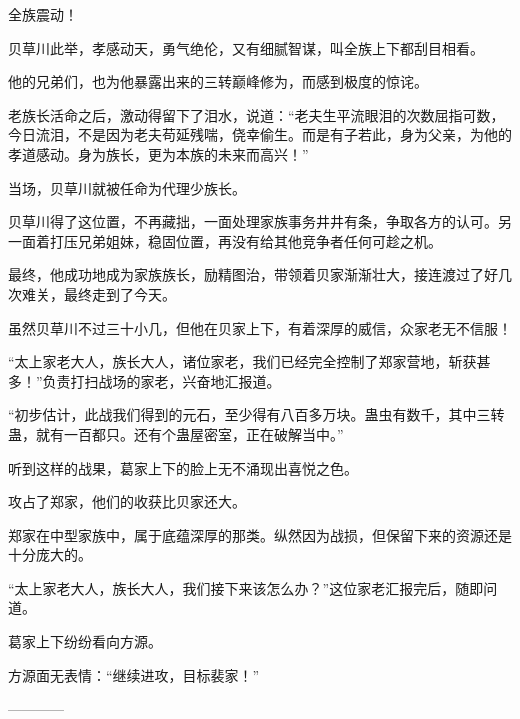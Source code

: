 \begin{this_body}
全族震动！

贝草川此举，孝感动天，勇气绝伦，又有细腻智谋，叫全族上下都刮目相看。

他的兄弟们，也为他暴露出来的三转巅峰修为，而感到极度的惊诧。

老族长活命之后，激动得留下了泪水，说道：“老夫生平流眼泪的次数屈指可数，今日流泪，不是因为老夫苟延残喘，侥幸偷生。而是有子若此，身为父亲，为他的孝道感动。身为族长，更为本族的未来而高兴！”

当场，贝草川就被任命为代理少族长。

贝草川得了这位置，不再藏拙，一面处理家族事务井井有条，争取各方的认可。另一面着打压兄弟姐妹，稳固位置，再没有给其他竞争者任何可趁之机。

最终，他成功地成为家族族长，励精图治，带领着贝家渐渐壮大，接连渡过了好几次难关，最终走到了今天。

虽然贝草川不过三十小几，但他在贝家上下，有着深厚的威信，众家老无不信服！

“太上家老大人，族长大人，诸位家老，我们已经完全控制了郑家营地，斩获甚多！”负责打扫战场的家老，兴奋地汇报道。

“初步估计，此战我们得到的元石，至少得有八百多万块。蛊虫有数千，其中三转蛊，就有一百都只。还有个蛊屋密室，正在破解当中。”

听到这样的战果，葛家上下的脸上无不涌现出喜悦之色。

攻占了郑家，他们的收获比贝家还大。

郑家在中型家族中，属于底蕴深厚的那类。纵然因为战损，但保留下来的资源还是十分庞大的。

“太上家老大人，族长大人，我们接下来该怎么办？”这位家老汇报完后，随即问道。

葛家上下纷纷看向方源。

方源面无表情：“继续进攻，目标裴家！”

------------

\end{this_body}

